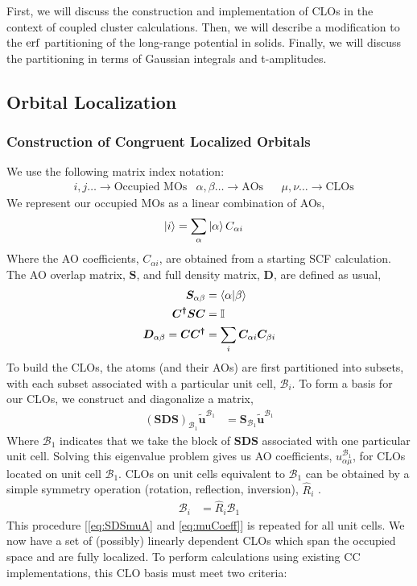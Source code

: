 \documentclass[letterpaper, 12pt]{article}
\newcommand{\matr}[1]{\bm{#1}} %
\begin{document}
First, we will discuss the construction and implementation of CLOs in the context of coupled cluster calculations. Then, we will describe a modification to the $\erf $ partitioning of the long-range potential in solids. Finally, we will discuss the partitioning in terms of Gaussian integrals and t-amplitudes.


\subsection{Orbital Localization}
\subsubsection{Construction of Congruent Localized Orbitals} \label{subsec:ConstructionCLO}
We use the following matrix index notation:
\begin{align*}
&i,j \dots \rightarrow \text{Occupied MOs} & \alpha , \beta \dots \rightarrow \text{AOs} && \mu  , \nu \dots \rightarrow \text{CLOs}
\end{align*}
We represent our occupied MOs as a linear combination of AOs,
\begin{align}
\ket{i} &= \sum_{\alpha} \ket{\alpha} C_{\alpha i}
\end{align}
Where the AO coefficients, $C_{\alpha i}$, are obtained from  a starting SCF calculation. The AO overlap matrix, $\matr{S}$, and full density matrix, $\matr{D}$, are defined as usual,
\begin{align}
\matr{S}_{\alpha \beta} &= \braket{\alpha|\beta}\\
\matr{C^{\dagger}SC} &= \matr{\mathbb{I}}\\
\matr{D}_{\alpha \beta}=\matr{CC^{\dagger}}&=\sum_i \matr{C}_{\alpha i}\matr{C}_{\beta i}
\end{align}
To build the CLOs, the atoms (and their AOs) are first partitioned into subsets, with each subset associated with a particular unit cell, $\mathcal{B}_i$. To form a basis for our CLOs, we construct and diagonalize a matrix,
\begin{align}
(\matr{SDS})_{\mathcal{B}_1} \tilde{\matr{u}}^{\mathcal{B}_1} &= \matr{S}_{\mathcal{B}_1} \matr{\tilde{u}}^{\mathcal{B}_1}
\label{eq:SDSmuA}
\end{align}
Where ${\mathcal{B}_1}$ indicates that we take the block of $\matr{SDS}$ associated with one particular unit cell. Solving this eigenvalue problem gives us AO coefficients, $u^{\mathcal{B}_1}_{\alpha\mu} $,  for CLOs located on unit cell ${\mathcal{B}_1}$. CLOs on unit cells equivalent to ${\mathcal{B}_1}$ can be obtained by a simple symmetry operation (rotation, reflection, inversion),  $\hat{R}_i$ .
\begin{align}
{\mathcal{B}_i} &= \hat{R}_i {\mathcal{B}_1}
\label{eq:muCoeff}
\end{align}
This procedure [\eqref{eq:SDSmuA} and \eqref{eq:muCoeff}] is repeated for all unit cells. We now have a set of (possibly) linearly dependent CLOs which span the occupied space and are fully localized. To perform calculations using existing CC implementations, this CLO basis must meet two criteria:
\end{document}
